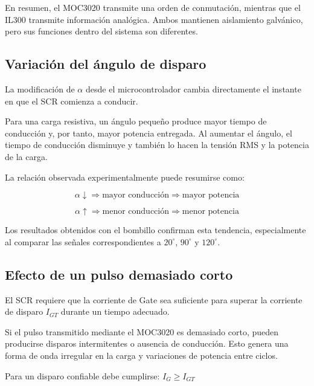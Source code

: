 \documentclass[12pt]{article}
\begin{document}
En resumen, el MOC3020 transmite una orden de conmutación, mientras que el IL300 transmite información analógica. Ambos mantienen aislamiento galvánico, pero sus funciones dentro del sistema son diferentes.


\subsection{Variación del ángulo de disparo}

La modificación de $\alpha$ desde el microcontrolador cambia directamente el instante en que el SCR comienza a conducir.

Para una carga resistiva, un ángulo pequeño produce mayor tiempo de conducción y, por tanto, mayor potencia entregada. Al aumentar el ángulo, el tiempo de conducción disminuye y también lo hacen la tensión RMS y la potencia de la carga.

La relación observada experimentalmente puede resumirse como:

\[
\alpha\downarrow
\Rightarrow
\text{mayor conducción}
\Rightarrow
\text{mayor potencia}
\]

\[
\alpha\uparrow
\Rightarrow
\text{menor conducción}
\Rightarrow
\text{menor potencia}
\]

Los resultados obtenidos con el bombillo confirman esta tendencia, especialmente al comparar las señales correspondientes a $20^\circ$, $90^\circ$ y $120^\circ$.


\subsection{Efecto de un pulso demasiado corto}

El SCR requiere que la corriente de Gate sea suficiente para superar la corriente de disparo $I_{GT}$ durante un tiempo adecuado.

Si el pulso transmitido mediante el MOC3020 es demasiado corto, pueden producirse disparos intermitentes o ausencia de conducción. Esto genera una forma de onda irregular en la carga y variaciones de potencia entre ciclos.

Para un disparo confiable debe cumplirse: $I_G \geq I_{GT}$
\end{document}
